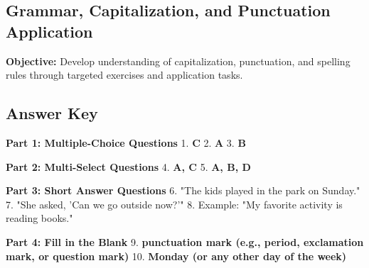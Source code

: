 \documentclass[12pt]{article}
\begin{document}
\subsection*{Grammar, Capitalization, and Punctuation Application}
\onehalfspacing

\begin{tcolorbox}[colframe=black!40, colback=gray!0, title=Learning Objective]
\textbf{Objective:} Develop understanding of capitalization, punctuation, and spelling rules through targeted exercises and application tasks.
\end{tcolorbox}


\subsection*{Answer Key}

\textbf{Part 1: Multiple-Choice Questions}  
1. \textbf{C}  
\vspace{0.5cm}
2. \textbf{A}  
3. \textbf{B}  

\textbf{Part 2: Multi-Select Questions}
\vspace{0.5cm}
4. \textbf{A, C}  
5. \textbf{A, B, D}  

\textbf{Part 3: Short Answer Questions}  
6. "The kids played in the park on Sunday."  
7. "She asked, 'Can we go outside now?'"  
8. Example: "My favorite activity is reading books."  
\vspace{0.5cm}

\textbf{Part 4: Fill in the Blank}  
9. \textbf{punctuation mark (e.g., period, exclamation mark, or question mark)}  
10. \textbf{Monday (or any other day of the week)}  
\end{document}

